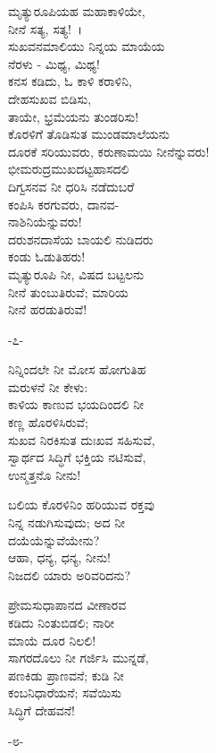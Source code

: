 ಮೃತ್ಯುರೂಪಿಯಹ ಮಹಾಕಾಳಿಯೇ,\\ನೀನೆ ಸತ್ಯ, ಸತ್ಯ!~।\\ಸುಖವನಮಾಲಿಯು ನಿನ್ನಯ ಮಾಯೆಯ\\ನೆರಳು - ಮಿಥ್ಯ, ಮಿಥ್ಯ!\\ಕನಸ ಕಡಿದು, ಓ ಕಾಳಿ ಕರಾಳಿನಿ,\\ದೇಹಸುಖವ ಬಿಡಿಸು,\\ತಾಯೇ, ಭ್ರಮೆಯನು ತುಂಡರಿಸು!\\ಕೊರಳಿಗೆ ತೊಡಿಸುತ ಮುಂಡಮಾಲೆಯನು\\ದೂರಕೆ ಸರಿಯುವರು, ಕರುಣಾಮಯಿ ನೀನೆನ್ನುವರು!\\ಭೀಮರುದ್ರಮುಖದಟ್ಟಹಾಸದಲಿ\\ದಿಗ್ವಸನವ ನೀ ಧರಿಸಿ ನಡೆದುಬರೆ\\ಕಂಪಿಸಿ ಕರಗುವರು, ದಾನವ-\\ನಾಶಿನಿಯೆನ್ನುವರು!\\ದರುಶನದಾಸೆಯ ಬಾಯಲಿ ನುಡಿದರು\\ಕಂಡು ಓಡುತಿಹರು!\\ಮೃತ್ಯುರೂಪಿ ನೀ, ವಿಷದ ಬಟ್ಟಲನು\\ನೀನೆ ತುಂಬುತಿರುವೆ; ಮಾರಿಯ\\ನೀನೆ ಹರಡುತಿರುವೆ!

\begin{center}
-೭-
\end{center}

ನಿನ್ನಿಂದಲೇ ನೀ ಮೋಸ ಹೋಗುತಿಹ\\ಮರುಳನೆ ನೀ ಕೇಳು:\\ಕಾಳಿಯ ಕಾಣುವ ಭಯದಿಂದಲಿ ನೀ\\ಕಣ್ಣ ಹೊರಳಿಸಿರುವೆ;\\ಸುಖವ ನಿರಕಿಸುತ ದುಃಖವ ಸಹಿಸುವೆ,\\ಸ್ವಾರ್ಥದ ಸಿದ್ಧಿಗೆ ಭಕ್ತಿಯ ನಟಿಸುವೆ,\\ಉನ್ಮತ್ತನೊ ನೀನು!

ಬಲಿಯ ಕೊರಳಿನಿಂ ಹರಿಯುವ ರಕ್ತವು\\ನಿನ್ನ ನಡುಗಿಸುವುದು; ಅದ ನೀ\\ದಯೆಯೆನ್ನುವೆಯೇನು?\\ಆಹಾ, ಧನ್ಯ, ಧನ್ಯ, ನೀನು!\\
 ನಿಜದಲಿ ಯಾರು ಅರಿವರಿದನು?

ಪ್ರೇಮಸುಧಾಪಾನದ ವೀಣಾರವ\\ಕಡಿದು ನಿಂತುಬಿಡಲಿ; ನಾರೀ\\ಮಾಯೆ ದೂರ ನಿಲಲಿ!\\ಸಾಗರದೊಲು ನೀ ಗರ್ಜಿಸಿ ಮುನ್ನಡೆ,\\ಪಣಕಿಡು ಪ್ರಾಣವನೆ; ಕುಡಿ ನೀ\\ಕಂಬನಿಧಾರೆಯನೆ; ಸವೆಯಿಸು\\ಸಿದ್ಧಿಗೆ ದೇಹವನೆ!

\begin{center}
-೮-
\end{center}

